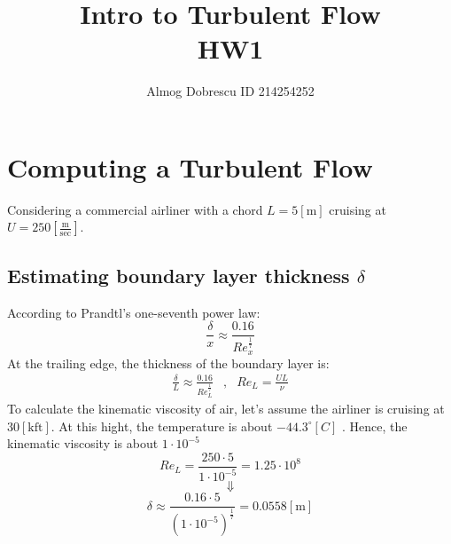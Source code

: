 \documentclass[11pt, a4paper]{article}
\title{Intro to Turbulent Flow \\ HW1}
\author{Almog Dobrescu ID 214254252}
\begin{document}
\thispagestyle{empty}
\maketitle
\newpage


\tableofcontents
\vfil
\listoffigures
\vfil
\lstlistoflistings
\newpage

\printnomenclature
\newpage

\pagestyle{fancy}
\setcounter{page}{1}

\section{Computing a Turbulent Flow}
Considering a commercial airliner with a chord $L=5\left[\mathrm{m}\right]$ cruising at $U=250\left[\frac{\mathrm{m}}{\mathrm{sec}}\right]$.

\subsection{Estimating boundary layer thickness $\delta$}
According to Prandtl's one-seventh power law:
\begin{equation}
    \frac{\delta}{x}\approx\frac{0.16}{Re_x^\frac{1}{7}}
\end{equation}
At the trailing edge, the thickness of the boundary layer is:
\begin{equation}
    \begin{matrix}
        \displaystyle\frac{\delta}{L}\approx\frac{0.16}{Re_L^\frac{1}{7}} &,& \displaystyle Re_L=\frac{UL}{\nu}
    \end{matrix}
\end{equation}
To calculate the kinematic viscosity of air, let's assume the airliner is cruising at $30[\mathrm{kft}]$. At this hight, the temperature is about $-44.3^\circ[C]$ \cite{temp_distribution_at_atmosphere}. Hence, the kinematic viscosity is about $1\cdot10^{-5}$ \cite{air_properties}
\begin{equation}
    Re_L=\frac{250\cdot5}{1\cdot10^{-5}}=1.25\cdot10^8
\end{equation}
\begin{equation*}
    \Downarrow
\end{equation*}
\begin{equation}
    \delta\approx\frac{0.16\cdot5}{\left(1\cdot10^{-5}\right)^\frac{1}{7}}=0.0558[\mathrm{m}]
\end{equation}
\end{document}
